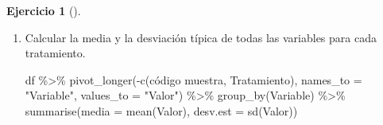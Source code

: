 \documentclass[
  spanish,
  a4paper,
]{scrreport}
\newenvironment{Shaded}{\begin{snugshade}}{\end{snugshade}}
\newcommand{\AttributeTok}[1]{\textcolor[rgb]{0.40,0.45,0.13}{#1}}
\newcommand{\FunctionTok}[1]{\textcolor[rgb]{0.28,0.35,0.67}{#1}}
\newcommand{\NormalTok}[1]{\textcolor[rgb]{0.00,0.23,0.31}{#1}}
\newcommand{\SpecialCharTok}[1]{\textcolor[rgb]{0.37,0.37,0.37}{#1}}
\newcommand{\StringTok}[1]{\textcolor[rgb]{0.13,0.47,0.30}{#1}}
\theoremstyle{definition}
\newtheorem{exercise}{Ejercicio}[chapter]
\theoremstyle{definition}
\theoremstyle{remark}
\begin{document}
\begin{exercise}[]
\begin{enumerate}
\begin{tcolorbox}
\begin{Shaded}
\begin{Highlighting}[]
\NormalTok{df }\SpecialCharTok{\%\textgreater{}\%}
    \FunctionTok{group\_by}\NormalTok{(Tratamiento) }\SpecialCharTok{\%\textgreater{}\%}
    \FunctionTok{summarise}\NormalTok{(}\AttributeTok{media =} \FunctionTok{mean}\NormalTok{(}\StringTok{\textasciigrave{}}\AttributeTok{mas cor (g)}\StringTok{\textasciigrave{}}\NormalTok{), }\AttributeTok{desv.est =} \FunctionTok{sd}\NormalTok{(}\StringTok{\textasciigrave{}}\AttributeTok{mas cor (g)}\StringTok{\textasciigrave{}}\NormalTok{))}
\end{Highlighting}
\end{Shaded}

\begin{verbatim}
# A tibble: 3 x 3
  Tratamiento  media desv.est
  <fct>        <dbl>    <dbl>
1 Control       231.     13.6
2 Dexametasona  191.     14.2
3 Kanamicina    229.     13.9
\end{verbatim}

  \end{tcolorbox}
\item
  Calcular la media y la desviación típica de todas las variables para
  cada tratamiento.

  \begin{tcolorbox}[enhanced jigsaw, arc=.35mm, bottomrule=.15mm, bottomtitle=1mm, breakable, colback=white, colbacktitle=quarto-callout-note-color!10!white, colframe=quarto-callout-note-color-frame, coltitle=black, left=2mm, leftrule=.75mm, opacityback=0, opacitybacktitle=0.6, rightrule=.15mm, title=\textcolor{quarto-callout-note-color}{\faInfo}\hspace{0.5em}{Solución}, titlerule=0mm, toprule=.15mm, toptitle=1mm]

\begin{Shaded}
\begin{Highlighting}[]
\NormalTok{df }\SpecialCharTok{\%\textgreater{}\%}
    \FunctionTok{pivot\_longer}\NormalTok{(}\SpecialCharTok{{-}}\FunctionTok{c}\NormalTok{(}\StringTok{\textasciigrave{}}\AttributeTok{código muestra}\StringTok{\textasciigrave{}}\NormalTok{, Tratamiento), }\AttributeTok{names\_to =} \StringTok{"Variable"}\NormalTok{, }\AttributeTok{values\_to =} \StringTok{"Valor"}\NormalTok{) }\SpecialCharTok{\%\textgreater{}\%}
    \FunctionTok{group\_by}\NormalTok{(Variable) }\SpecialCharTok{\%\textgreater{}\%}
    \FunctionTok{summarise}\NormalTok{(}\AttributeTok{media =} \FunctionTok{mean}\NormalTok{(Valor), }\AttributeTok{desv.est =} \FunctionTok{sd}\NormalTok{(Valor))}
\end{Highlighting}
\end{Shaded}


\end{tcolorbox}
\end{enumerate}
\end{exercise}
\end{document}
